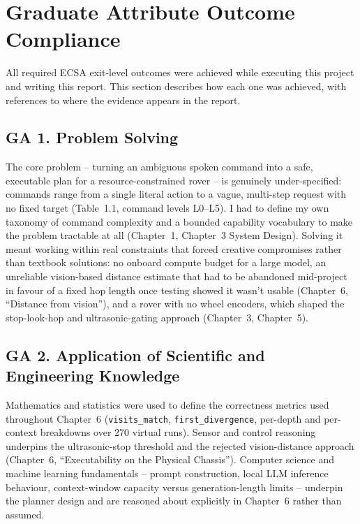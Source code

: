 \chapter{Graduate Attribute Outcome Compliance}
\label{app:ga}

All required ECSA exit-level outcomes were achieved while executing this
project and writing this report. This section describes how each one was
achieved, with references to where the evidence appears in the report.

\section*{GA 1. Problem Solving}

The core problem -- turning an ambiguous spoken command into a safe,
executable plan for a resource-constrained rover -- is genuinely
under-specified: commands range from a single literal action to a vague,
multi-step request with no fixed target (Table~1.1, command levels L0--L5).
I had to define my own taxonomy of command complexity and a bounded
capability vocabulary to make the problem tractable at all (Chapter~1,
Chapter~3 System Design). Solving it meant working within real constraints
that forced creative compromises rather than textbook solutions: no onboard
compute budget for a large model, an unreliable vision-based distance
estimate that had to be abandoned mid-project in favour of a fixed hop
length once testing showed it wasn't usable (Chapter~6, ``Distance from
vision''), and a rover with no wheel encoders, which shaped the
stop-look-hop and ultrasonic-gating approach (Chapter~3, Chapter~5).

\section*{GA 2. Application of Scientific and Engineering Knowledge}

Mathematics and statistics were used to define the correctness metrics used
throughout Chapter~6 (\texttt{visits\_match}, \texttt{first\_divergence},
per-depth and per-context breakdowns over 270 virtual runs). Sensor and
control reasoning underpins the ultrasonic-stop threshold and the rejected
vision-distance approach (Chapter~6, ``Executability on the Physical
Chassis''). Computer science and machine learning fundamentals --
prompt construction, local LLM inference behaviour, context-window
capacity versus generation-length limits -- underpin the planner design
and are reasoned about explicitly in Chapter~6 rather than assumed.

